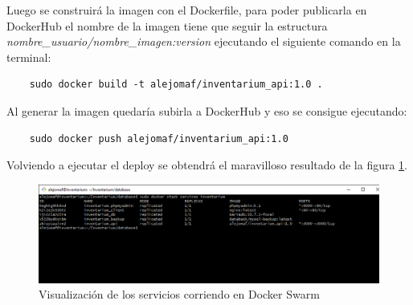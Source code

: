 Luego se construirá la imagen con el Dockerfile, para poder publicarla en DockerHub el nombre de la imagen tiene que seguir la estructura \textit{nombre\_usuario/nombre\_imagen:version} ejecutando el siguiente comando en la terminal:
\begin{verbatim}
    sudo docker build -t alejomaf/inventarium_api:1.0 .
\end{verbatim}
Al generar la imagen quedaría subirla a DockerHub y eso se consigue ejecutando:
\begin{verbatim}
    sudo docker push alejomaf/inventarium_api:1.0
\end{verbatim}
Volviendo a ejecutar el deploy se obtendrá el maravilloso resultado de la figura \ref{fig:docker-swarm-final}.
\begin{figure}
    \centering
    \includegraphics[scale=0.4, keepaspectratio]{imagenes/complemento/docker-swarm/docker-FINAL.png}
    \caption{Visualización de los servicios corriendo en Docker Swarm}\label{fig:docker-swarm-final}
\end{figure}

